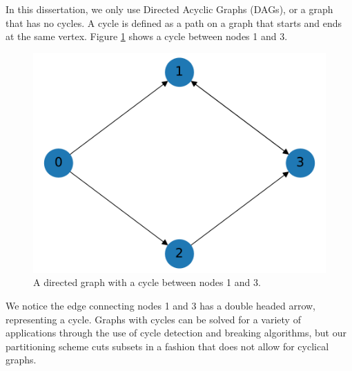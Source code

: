 In this dissertation, we only use Directed Acyclic Graphs (DAGs), or a graph that has no cycles.  A cycle is defined as a path on a graph that starts and ends at the same vertex. Figure \ref{cycle_example} shows a cycle between nodes 1 and 3.
\begin{figure}[H]
\centering
\includegraphics[scale=0.5]{../../figures/cycle_example.pdf}
\caption{A directed graph with a cycle between nodes 1 and 3.}
\label{cycle_example}
\end{figure}
We notice the edge connecting nodes 1 and 3 has a double headed arrow, representing a cycle. Graphs with cycles can be solved for a variety of applications through the use of cycle detection and breaking algorithms, but our partitioning scheme cuts subsets in a fashion that does not  allow for cyclical graphs.

